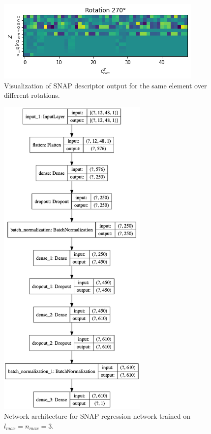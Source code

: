 \begin{figure}
\begin{multicols}{2}
      \includegraphics[width=\linewidth]{figures/regression/snap/rot270.png}\par
  \end{multicols}
  \caption{Visualization of SNAP descriptor output for the same element over different rotations.}
  \label{fig:snap_roation_out}
\end{figure}


\begin{figure} [h]
  \centering
  \includegraphics[width=0.65\textwidth]{figures/regression/snap/network_3_3.png} 
  \caption{Network architecture for SNAP regression network trained on $l_{max} = n_{max} =3$. 
  }
  \label{fig:transferlearn}
\end{figure}
